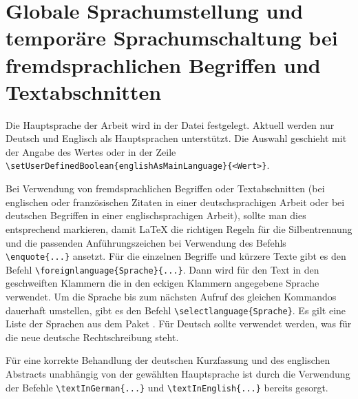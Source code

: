 \section[Globale Sprachumstellung und temporäre Sprachumschaltung]{Globale Sprachumstellung und temporäre Sprachumschaltung bei fremdsprachlichen Begriffen und Textabschnitten}%
%
%
%
%
\label{sec:Sprache}
%
Die Hauptsprache der Arbeit wird in der Datei  festgelegt.
Aktuell werden nur Deutsch und Englisch als Hauptsprachen unterstützt.
Die Auswahl geschieht mit der Angabe des Wertes  oder 
in der Zeile \lstinline|\setUserDefinedBoolean{englishAsMainLanguage}{<Wert>}|.

Bei Verwendung von fremdsprachlichen Begriffen oder Textabschnitten
(\zB bei englischen oder französischen Zitaten in einer deutschsprachigen Arbeit
oder bei deutschen Begriffen in einer englischsprachigen Arbeit),
sollte man dies entsprechend markieren,
damit \LaTeX{} die richtigen Regeln für die Silbentrennung
und die passenden Anführungszeichen bei Verwendung des Befehls
\lstinline|\enquote{...}| ansetzt.
Für die einzelnen Begriffe und kürzere Texte gibt es den Befehl
\lstinline|\foreignlanguage{Sprache}{...}|.
Dann wird für den Text in den geschweiften Klammern die in den eckigen Klammern angegebene Sprache verwendet.
Um die Sprache bis zum nächsten Aufruf des gleichen Kommandos dauerhaft umstellen,
gibt es den Befehl \lstinline|\selectlanguage{Sprache}|.
Es gilt eine Liste der Sprachen aus dem Paket .
Für Deutsch sollte  verwendet werden, was für die
neue deutsche Rechtschreibung steht.

Für eine korrekte Behandlung der deutschen Kurzfassung und des englischen Abstracts
unabhängig von der gewählten Hauptsprache ist durch die Verwendung der Befehle
\lstinline|\textInGerman{...}| und \lstinline|\textInEnglish{...}| bereits gesorgt.